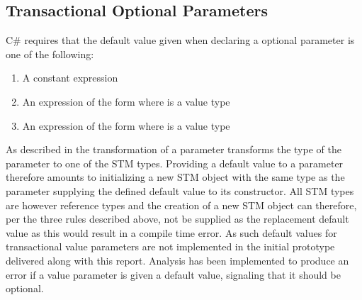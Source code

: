 \subsection{Transactional Optional Parameters}
C\# requires that the default value given when declaring a optional parameter is one of the following\cite[p. 309]{csharp2013specificaiton}:
\begin{enumerate}
	\item A constant expression
	\item An expression of the form  where  is a value type
	\item An expression of the form  where  is a value type
\end{enumerate}
As described in  the transformation of a  parameter transforms the type of the parameter to one of the \ac{STM} types. Providing a default value to a  parameter therefore amounts to initializing a new \ac{STM} object with the same type as the parameter supplying the defined default value to its constructor. All \ac{STM} types are however reference types and the creation of a new \ac{STM} object can therefore, per the three rules described above, not be supplied as the replacement default value as this would result in a compile time error. As such default values for transactional value parameters are not implemented in the initial prototype delivered along with this report. Analysis has been implemented to produce an error if a  value parameter is given a default value, signaling that it should be optional.


